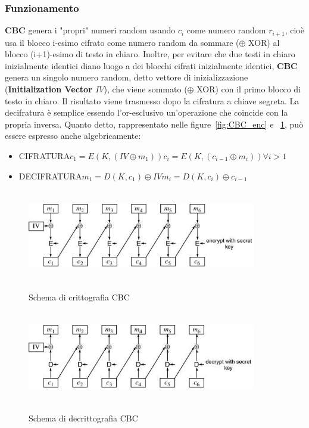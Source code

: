 \subsubsection{Funzionamento}
\textbf{CBC} genera i "propri" numeri random usando $c_{i}$ come numero random $r_{i+1}$, cioè usa il blocco i-esimo cifrato come numero random da sommare ($\oplus$ XOR) al blocco (i+1)-esimo di testo in chiaro.
\newline \newline
Inoltre, per evitare che due testi in chiaro inizialmente identici diano luogo a dei blocchi cifrati inizialmente identici, \textbf{CBC} genera un singolo numero random, detto vettore di inizializzazione (\textbf{Initialization Vector $IV$}), che viene sommato ($\oplus$ XOR) con il primo blocco di testo in chiaro. Il risultato viene trasmesso dopo la cifratura a chiave segreta. La decifratura è semplice essendo l'or-esclusivo un'operazione che coincide con la propria inversa.
\newline \newline
Quanto detto, rappresentato nelle figure~\ref{fig:CBC_enc} e ~\ref{fig:CBC_dec}, può essere espresso anche algebricamente:
\begin{itemize}
\item CIFRATURA\newline $c_{1} = E(K, (IV \oplus m_{1}))$\newline $c_{i} = E(K, (c_{i-1} \oplus m_{i})) \forall i > 1$
\item DECIFRATURA\newline $m_{1} = D(K,c_{1})\oplus IV$\newline $m_{i} = D(K,c_{i})\oplus c_{i-1}$
\end{itemize}
\begin{figure}[htbp]
	\centering%
	\subfigure%
	{\includegraphics[height=4cm, width=10cm, keepaspectratio]{Immagini/modalita_operative/CBC_enc.png}}
	\caption{Schema di crittografia CBC \label{fig:CBC_enc}} 	
	\subfigure%
	{\includegraphics[height=4cm, width=10cm, keepaspectratio]{Immagini/modalita_operative/CBC_dec.png}}
	\caption{Schema di decrittografia CBC \label{fig:CBC_dec}} 
\end{figure}
